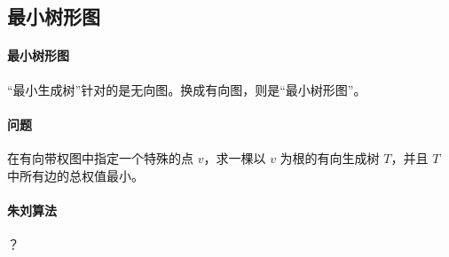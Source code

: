 \subsection{最小树形图}
	\paragraph{最小树形图} “最小生成树”针对的是无向图。换成有向图，则是“最小树形图”。
	
	\paragraph{问题} 在有向带权图中指定一个特殊的点 $v$，求一棵以 $v$ 为根的有向生成树 $T$，并且 $T$ 中所有边的总权值最小。
	
	\paragraph{朱刘算法} ？